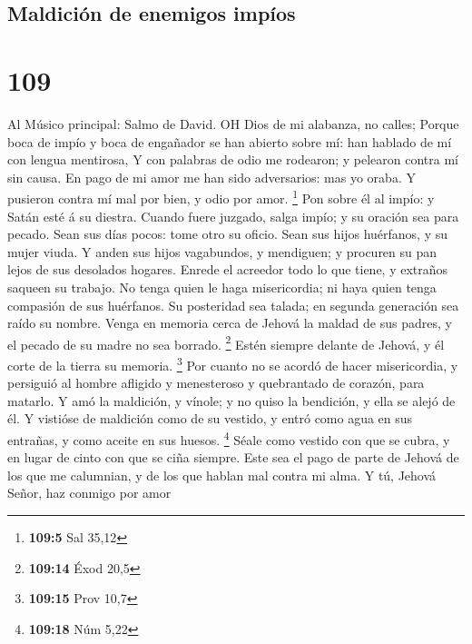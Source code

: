 \hypertarget{maldiciuxf3n-de-enemigos-impuxedos}{%
\subsection{Maldición de enemigos
impíos}\label{maldiciuxf3n-de-enemigos-impuxedos}}

\hypertarget{section-108}{%
\section{109}\label{section-108}}

 Al Músico principal: Salmo de David. OH Dios de mi
alabanza, no calles;  Porque boca de impío y boca de
engañador se han abierto sobre mí: han hablado de mí con lengua
mentirosa,  Y con palabras de odio me rodearon; y pelearon
contra mí sin causa.  En pago de mi amor me han sido
adversarios: mas yo oraba.  Y pusieron contra mí mal por
bien, y odio por amor. \footnote{\textbf{109:5} Sal 35,12} 
Pon sobre él al impío: y Satán esté á su diestra.  Cuando
fuere juzgado, salga impío; y su oración sea para pecado. 
Sean sus días pocos: tome otro su oficio.  Sean sus hijos
huérfanos, y su mujer viuda.  Y anden sus hijos vagabundos,
y mendiguen; y procuren su pan lejos de sus desolados hogares.
 Enrede el acreedor todo lo que tiene, y extraños saqueen
su trabajo.  No tenga quien le haga misericordia; ni haya
quien tenga compasión de sus huérfanos.  Su posteridad sea
talada; en segunda generación sea raído su nombre.  Venga
en memoria cerca de Jehová la maldad de sus padres, y el pecado de su
madre no sea borrado. \footnote{\textbf{109:14} Éxod 20,5} 
Estén siempre delante de Jehová, y él corte de la tierra su memoria.
\footnote{\textbf{109:15} Prov 10,7}  Por cuanto no se
acordó de hacer misericordia, y persiguió al hombre afligido y
menesteroso y quebrantado de corazón, para matarlo.  Y amó
la maldición, y vínole; y no quiso la bendición, y ella se alejó de él.
 Y vistióse de maldición como de su vestido, y entró como
agua en sus entrañas, y como aceite en sus huesos. \footnote{\textbf{109:18}
  Núm 5,22}  Séale como vestido con que se cubra, y en
lugar de cinto con que se ciña siempre.  Este sea el pago
de parte de Jehová de los que me calumnian, y de los que hablan mal
contra mi alma.  Y tú, Jehová Señor, haz conmigo por amor
